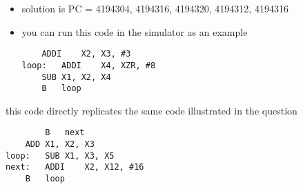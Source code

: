 \begin{frame}[fragile]
\begin{multicols}{2}
\ifnum{}\fi
\end{multicols}
 



\BNotes\ifnum{}
\begin{itemize}
\item solution is PC = 4194304, 4194316, 4194320, 4194312, 4194316
\item you can run this code in the simulator as an example
\begin{verbatim}
    ADDI	X2, X3, #3
loop:	ADDI	X4, XZR, #8
	SUB	X1, X2, X4
	B	loop
\end{verbatim}
	
\end{itemize}
\item this code directly replicates the same code illustrated in the question
\begin{verbatim}
    	B	next
	ADD	X1, X2, X3
loop:	SUB	X1, X3, X5
next:	ADDI	X2, X12, #16
	B	loop
\end{verbatim}
\fi\ENotes
\end{frame}


